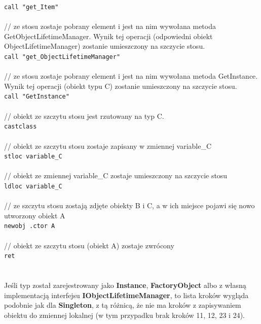 \documentclass[12pt]{article}
\begin{document}
\texttt{call "get\_Item"}\\
\\
// ze stosu zostaje pobrany element i jest na nim wywołana metoda GetObjectLifetimeManager. Wynik tej operacji (odpowiedni obiekt ObjectLifetimeManager) zostanie umieszczony na szczycie stosu.\\
\texttt{call "get\_ObjectLifetimeManager"}\\
\\
// ze stosu zostaje pobrany element i jest na nim wywołana metoda GetInstance. Wynik tej operacji (obiekt typu C) zostanie umieszczony na szczycie stosu.\\
\texttt{call "GetInstance"}\\
\\
// obiekt ze szczytu stosu jest rzutowany na typ C.\\
\texttt{castclass}\\
\\
// obiekt ze szczytu stosu zostaje zapisany w zmiennej variable\_C\\
\texttt{stloc variable\_C}\\
\\
// obiekt ze zmiennej variable\_C zostaje umieszczony na szczycie stosu\\
\texttt{ldloc variable\_C}\\
\\
// ze szczytu stosu zostają zdjęte obiekty B i C, a w ich miejsce pojawi się nowo utworzony obiekt A\\
\texttt{newobj .ctor A}\\
\\
// obiekt ze szczytu stosu (obiekt A) zostaje zwrócony\\
\texttt{ret}\\
\\
\\
Jeśli typ został zarejestrowany jako \textbf{Instance}, \textbf{FactoryObject} albo z własną implementacją interfejsu \textbf{IObjectLifetimeManager}, to lista kroków wygląda podobnie jak dla \textbf{Singleton}, z tą różnicą, że nie ma kroków z zapisywaniem obiektu do zmiennej lokalnej (w tym przypadku brak kroków 11, 12, 23 i 24).



\clearpage
\end{document}
